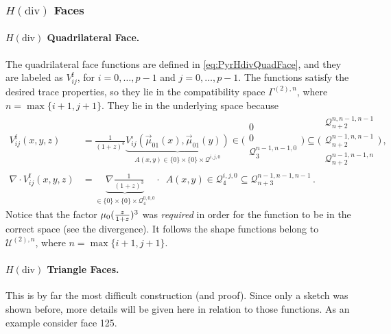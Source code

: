 \subsubsection{\texorpdfstring{$H(\mathrm{div})$}{Hdiv} Faces}

\paragraph{\texorpdfstring{$H(\mathrm{div})$}{Hdiv} Quadrilateral Face.}
The quadrilateral face functions are defined in \eqref{eq:PyrHdivQuadFace}, and they are labeled as $V_{ij}^\mathrm{f}$, for $i=0,\ldots,p-1$ and $j=0,\ldots,p-1$.
The functions satisfy the desired trace properties, so they lie in the compatibility space $\Gamma^{(2),n}$, where $n=\max\{i+1,j+1\}$.
They lie in the underlying space because
\begin{equation}
\begin{aligned}
	V_{ij}^\mathrm{f}(x,y,z)&\!=\!\textstyle{\frac{1}{(1+z)^3}}
		\underbrace{V_{ij}^\square(\vec{\mu}_{01}(x),\vec{\mu}_{01}(y))}_{A(x,y)\in\{0\}\!\times\!\{0\}\!\times\!\mathcal{Q}^{i,j,0}}
			\!\in\!\Bigg(\begin{smallmatrix}0\\[2pt]0\\[2pt]\mathcal{Q}_3^{n-1,n-1,0}\end{smallmatrix}\Bigg)
				\subseteq\Bigg(\begin{smallmatrix}\mathcal{Q}_{n+2}^{n,n-1,n-1}\\[2pt]\mathcal{Q}_{n+2}^{n-1,n,n-1}\\[2pt]
					\mathcal{Q}_{n+2}^{n-1,n-1,n}\end{smallmatrix}\Bigg)\,,\\
	\nabla\!\cdot\! V_{ij}^\mathrm{f}(x,y,z)&\!=
		\underbrace{\nabla\textstyle{\frac{1}{(1+z)^3}}}_{\in\{0\}\!\times\!\{0\}\!\times\!\mathcal{Q}_{4}^{0,0,0}}
			\!\!\!\!\cdot\,\,\, A(x,y)\in\mathcal{Q}_{4}^{i,j,0}
				\subseteq\mathcal{Q}_{n+3}^{n-1,n-1,n-1}\,.
\end{aligned}
\label{eq:PyrHdivQuadFaceProof}
\end{equation}
Notice that the factor $\mu_0(\textstyle{\frac{z}{1+z}})^3$ was \textit{required} in order for the function to be in the correct space (see the divergence).
It follows the shape functions belong to $\mathcal{U}^{(2),n}$, where $n=\max\{i+1,j+1\}$.

\paragraph{\texorpdfstring{$H(\mathrm{div})$}{Hdiv} Triangle Faces.}
This is by far the most difficult construction (and proof).
Since only a sketch was shown before, more details will be given here in relation to those functions.
As an example consider face 125.


